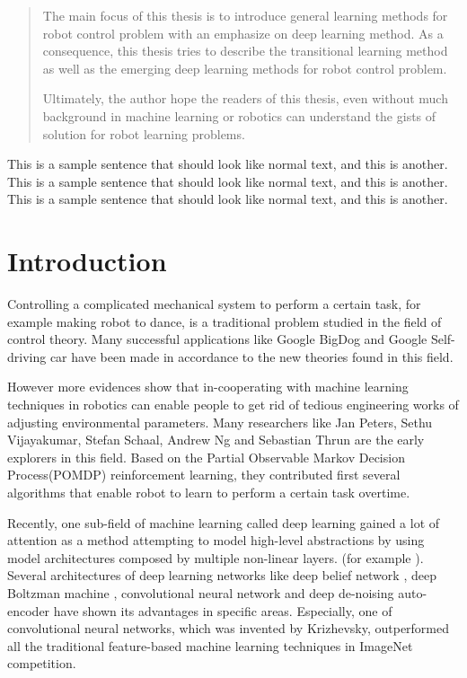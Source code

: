 \documentclass[officiallayout]{tktla}
\begin{document}
\begin{abstract}
The main focus of this thesis is to introduce general learning methods for robot control problem with an emphasize on deep learning method. As a consequence, this thesis tries to describe the transitional learning method as well as the emerging deep learning methods for robot control problem.

Ultimately, the author hope the readers of this thesis, even without much background in machine learning or robotics can understand the gists of solution for robot learning problems. 
\end{abstract}

\begin{acknowledgements}
  This is a sample sentence that should look like normal text, and
  this is another. This is a sample sentence that should look like
  normal text, and this is another. This is a sample sentence that
  should look like normal text, and this is another.
\end{acknowledgements}

\tableofcontents



\mainmatter
\chapter{Introduction}

Controlling a complicated mechanical system to perform a certain task, for example making robot to dance, is a traditional problem studied in the field of control theory. Many successful applications like Google BigDog\cite{Raibert2008} and Google Self-driving car \cite{guizzo2011google} have been made in accordance to the new theories found in this field.

However more evidences show that in-cooperating with machine learning techniques in robotics can enable people to get rid of tedious engineering works of adjusting environmental parameters. Many researchers like Jan Peters, Sethu Vijayakumar, Stefan Schaal, Andrew Ng and Sebastian Thrun are the early explorers in this field. Based on the Partial Observable Markov Decision Process(POMDP) reinforcement learning, they contributed first several algorithms that enable robot to learn to perform a certain task overtime.

Recently, one sub-field of machine learning called deep learning gained a lot of attention as a method attempting to model high-level abstractions by using model architectures composed by multiple non-linear layers. (for example \cite{Krizhevsky2012}). Several architectures of deep learning networks like deep belief network \cite{Hinton2006}, deep Boltzman machine \cite{Salakhutdinov2009}, convolutional neural network \cite{Krizhevsky2012} and deep de-noising auto-encoder \cite{Vincent2010} have shown its advantages in specific areas. Especially, one of convolutional neural networks, which was invented by Krizhevsky, outperformed all the traditional feature-based machine learning techniques in ImageNet competition.
\end{document}
